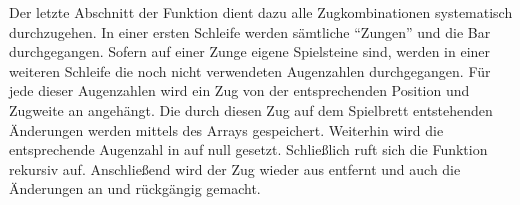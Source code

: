 Der letzte Abschnitt der Funktion dient dazu alle Zugkombinationen systematisch durchzugehen. In einer ersten Schleife werden sämtliche "`Zungen"' und die Bar durchgegangen. Sofern auf einer Zunge eigene Spielsteine sind, werden in einer weiteren Schleife die noch nicht verwendeten Augenzahlen durchgegangen. Für jede dieser Augenzahlen wird ein Zug von der entsprechenden Position und Zugweite an  angehängt. Die durch diesen Zug auf dem Spielbrett entstehenden Änderungen werden mittels des Arrays  gespeichert. Weiterhin wird die entsprechende Augenzahl in  auf null gesetzt. Schließlich ruft sich die Funktion rekursiv auf. Anschließend wird der Zug wieder aus  entfernt und auch die Änderungen an  und  rückgängig gemacht.

